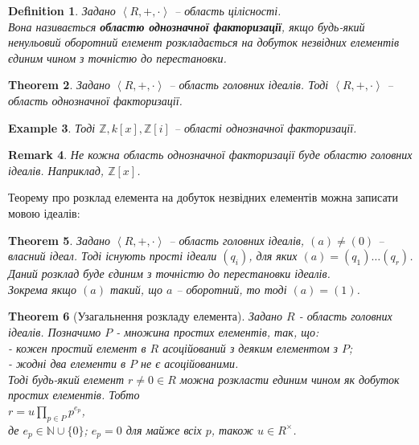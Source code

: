 \documentclass[a4paper, 10pt]{article}
\theoremstyle{theoremdd}
\newtheorem{theorem}{Theorem}[subsection]
\theoremstyle{theoremdd}
\newtheorem{definition}[theorem]{Definition}
\theoremstyle{theoremdd}
\theoremstyle{theoremdd}
\theoremstyle{theoremdd}
\newtheorem{example}[theorem]{Example}
\theoremstyle{theoremdd}
\theoremstyle{theoremdd}
\theoremstyle{theoremdd}
\theoremstyle{theoremdd}
\theoremstyle{theoremdd}
\theoremstyle{theoremdd}
\newtheorem{remark}[theorem]{Remark}
\theoremstyle{theoremdd}
\theoremstyle{theoremdd}
\theoremstyle{theoremdd}
\theoremstyle{theoremdd}
\begin{document}
\begin{definition}
Задано $\left< R,+,\cdot\right>$ -- область цілісності.\\
Вона називається \textbf{областю однозначної факторизації}, якщо будь-який ненульовий оборотний елемент розкладається на добуток незвідних елементів єдиним чином з точністю до перестановки.
\end{definition}

\begin{theorem}
Задано $\left< R,+,\cdot\right>$ -- область головних ідеалів. Тоді $\left< R,+,\cdot\right>$ -- область однозначної факторизації.
\end{theorem}

\begin{example}
Тоді $\mathbb{Z}, k[x], \mathbb{Z}[i]$ -- області однозначної факторизації.
\end{example}

\begin{remark}
Не кожна область однозначної факторизації буде областю головних ідеалів. Наприклад, $\mathbb{Z}[x]$.
\end{remark}

Теорему про розклад елемента на добуток незвідних елементів можна записати мовою ідеалів:
\begin{theorem}
Задано $\left< R,+,\cdot \right>$ -- область головних ідеалів, $(a) \neq (0)$ -- власний ідеал. Тоді існують прості ідеали $(q_i)$, для яких $(a) = (q_1) \dots (q_r)$. Даний розклад буде єдиним з точністю до перестановки ідеалів.\\
Зокрема якщо $(a)$ такий, що $a$ -- оборотний, то тоді $(a) = (1)$.
\end{theorem}

\begin{theorem}[Узагальнення розкладу елемента]
Задано $R$ - область головних ідеалів. Позначимо $P$ - множина простих елементів, так, що:\\
- кожен простий елемент в $R$ асоційований з деяким елементом з $P$;\\
- жодні два елементи в $P$ не є асоційованими.\\
Тоді будь-який елемент $r \neq 0 \in R$ можна розкласти единим чином як добуток простих елементів. Тобто\\
$r = u \displaystyle\prod_{p \in P} p^{e_p}$,\\
де $e_p \in \mathbb{N} \cup \{0\}$; $e_p = 0$ для майже всіх $p$, також $u \in R^\times$.
\end{theorem}
\end{document}
